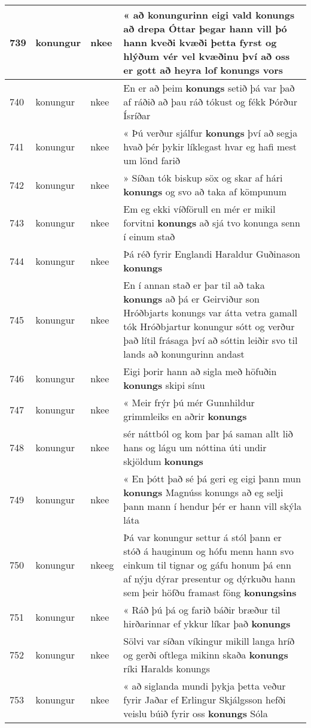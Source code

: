 \documentclass{article}
\begin{document}
\begin{longtable}{p{1cm}|p{1cm}|p{1cm}|p{13cm}}
\hline
739&konungur&nkee&« að konungurinn eigi vald \textbf{konungs} að drepa Óttar þegar hann vill þó hann kveði kvæði þetta fyrst og hlýðum vér vel kvæðinu því að oss er gott að heyra lof konungs vors\\
\hline
740&konungur&nkee&En er að þeim \textbf{konungs} setið þá var það af ráðið að þau ráð tókust og fékk Þórður Ísríðar\\
\hline
741&konungur&nkee&« Þú verður sjálfur \textbf{konungs} því að segja hvað þér þykir líklegast hvar eg hafi mest um lönd farið\\
\hline
742&konungur&nkee&» Síðan tók biskup söx og skar af hári \textbf{konungs} og svo að taka af kömpunum\\
\hline
743&konungur&nkee&Em eg ekki víðförull en mér er mikil forvitni \textbf{konungs} að sjá tvo konunga senn í einum stað\\
\hline
744&konungur&nkee&Þá réð fyrir Englandi Haraldur Guðinason \textbf{konungs} \\
\hline
745&konungur&nkee&En í annan stað er þar til að taka \textbf{konungs} að þá er Geirviður son Hróðbjarts konungs var átta vetra gamall tók Hróðbjartur konungur sótt og verður það lítil frásaga því að sóttin leiðir svo til lands að konungurinn andast\\
\hline
746&konungur&nkee&Eigi þorir hann að sigla með höfuðin \textbf{konungs} skipi sínu\\
\hline
747&konungur&nkee&« Meir frýr þú mér Gunnhildur grimmleiks en aðrir \textbf{konungs} \\
\hline
748&konungur&nkee&sér náttból og kom þar þá saman allt lið hans og lágu um nóttina úti undir skjöldum \textbf{konungs} \\
\hline
749&konungur&nkee&« En þótt það sé þá geri eg eigi þann mun \textbf{konungs} Magnúss konungs að eg selji þann mann í hendur þér er hann vill skýla láta\\
\hline
750&konungur&nkeeg&Þá var konungur settur á stól þann er stóð á hauginum og hófu menn hann svo einkum til tignar og gáfu honum þá enn af nýju dýrar presentur og dýrkuðu hann sem þeir höfðu framast föng \textbf{konungsins} \\
\hline
751&konungur&nkee&« Ráð þú þá og farið báðir bræður til hirðarinnar ef ykkur líkar það \textbf{konungs} \\
\hline
752&konungur&nkee&Sölvi var síðan víkingur mikill langa hríð og gerði oftlega mikinn skaða \textbf{konungs} ríki Haralds konungs\\
\hline
753&konungur&nkee&« að siglanda mundi þykja þetta veður fyrir Jaðar ef Erlingur Skjálgsson hefði veislu búið fyrir oss \textbf{konungs} Sóla\\

\end{longtable}
\end{document}
